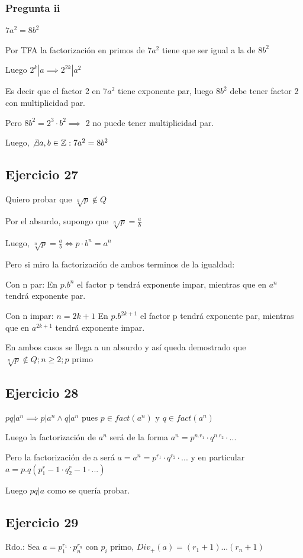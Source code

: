 \subsubsection{Pregunta ii}
$ 7a^2 = 8b^2 $

Por TFA la factorización en primos de $ 7a^2 $ tiene que ser igual a la de $ 8b^2 $

Luego $ 2^k | a \implies 2^{2k} | a^2 $

Es decir que el factor 2 en $ 7a^2 $ tiene exponente par, luego $ 8b^2 $ debe tener factor 2 con multiplicidad par.

Pero $ 8b^2 = 2^3 \cdot b^2 \implies $ 2 no puede tener multiplicidad par.

Luego, $ \not \exists a,b \in \mathbb{Z}: 7a^2 = 8b^2 $

\subsection{Ejercicio 27}
Quiero probar que $ \sqrt[n]{p} \not \in Q$

Por el absurdo, supongo que $ \sqrt[n]{p} = \frac{a}{b} $

Luego, $ \sqrt[n]{p} = \frac{a}{b} \iff p \cdot b^n = a^n $

Pero si miro la factorización de ambos terminos de la igualdad:

Con n par: En $ p.b^n $ el factor p tendrá exponente impar, mientras que en $ a^n $ tendrá exponente par.

Con n impar: $ n = 2k+1 $ En $ p.b^{2k+1} $ el factor p tendrá exponente par, mientras que en $ a^{2k+1} $ tendrá exponente impar.

En ambos casos se llega a un absurdo y así queda demostrado que $ \sqrt[n]{p} \not \in Q; n\geq 2; p \text{ primo} $

\subsection{Ejercicio 28}
$ pq|a^n \implies p|a^n \wedge q|a^n $ pues $ p\in fact(a^n) $ y $ q\in fact(a^n) $

Luego la factorización de $ a^n $ será de la forma $ a^n = p^{n.r_1} \cdot q^{n.r_2} \cdot ... $

Pero la factorización de a será $ a = a^n = p^{r_1} \cdot q^{r_2} \cdot ... $ y en particular $ a = p.q(p^r_1-1 \cdot q^r_2-1 \cdot ...) $

Luego $ pq|a $ como se quería probar.

\subsection{Ejercicio 29}
Rdo.: Sea $ a = p_1^{r_1} \cdot p_n^{r_n}$ con $p_i$ primo, $ Div_+(a) = (r_1 + 1)...(r_n + 1) $

